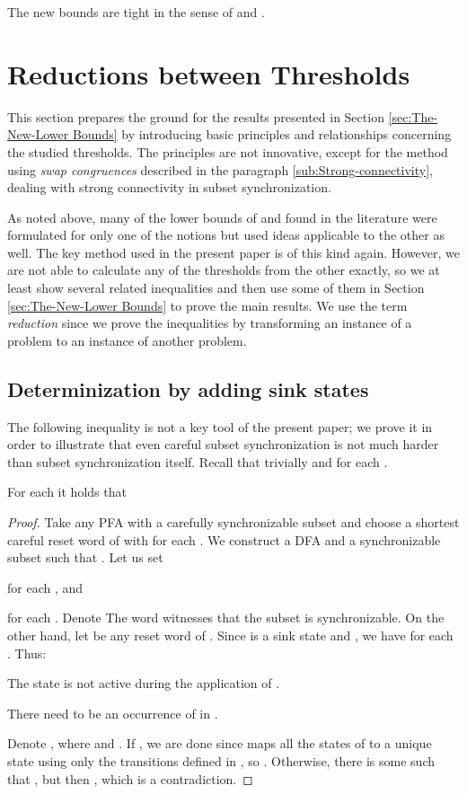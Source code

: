 \documentclass{ws-ijmpc}
\begin{document}
The new bounds are tight in the sense of 
and .


\section{Reductions between Thresholds\label{sec:Reductions-between-Thresholds}}

This section prepares the ground for the results presented in Section
\ref{sec:The-New-Lower Bounds} by introducing basic principles and
relationships concerning the studied thresholds. The principles are
not innovative, except for the method using \emph{swap congruences
}described in the paragraph \ref{sub:Strong-connectivity}, dealing
with strong connectivity in subset synchronization.

As noted above, many of the lower bounds of 
and  found in the literature were formulated
for only one of the notions but used ideas applicable to the other
as well. The key method used in the present paper is of this kind
again. However, we are not able to calculate any of the thresholds
from the other exactly, so we at least show several related inequalities
and then use some of them in Section \ref{sec:The-New-Lower Bounds}
to prove the main results. We use the term \emph{reduction} since
we prove the inequalities by transforming an instance of a problem
to an instance of another problem.


\subsection{Determinization by adding sink states }

The following inequality is not a key tool of the present paper; we
prove it in order to illustrate that even careful subset synchronization
is not much harder than subset synchronization itself. Recall that
trivially  and 
for each .
\begin{lemma}
\label{lem: car->sub}For each  it holds that

\end{lemma}
\begin{proof}
Take any PFA  with a carefully
synchronizable subset  and choose a shortest
careful reset word  of  with 
for each . We construct a DFA 
and a synchronizable subset  such that .
Let us set

for each , and

for each . Denote 
The word  witnesses that the subset  is synchronizable.
On the other hand, let  be any reset word of . Since 
is a sink state and , we have 
for each . Thus:
\begin{itemlist}
\item The state  is not active during the application
of .
\item There need to be an occurrence of  in . 
\end{itemlist}
Denote , where  and
. If ,
we are done since  maps all the states of  to a unique
state using only the transitions defined in , so .
Otherwise, there is some 
such that , but then ,
which is a contradiction.
\end{proof}
\end{document}
